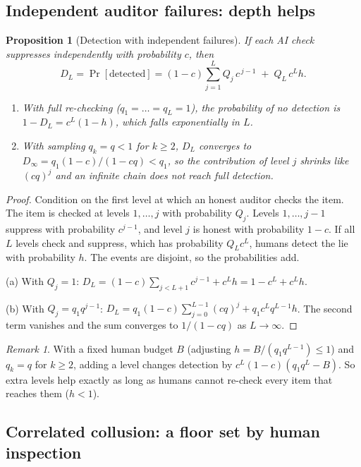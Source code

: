 \documentclass[11pt]{article}
\newtheorem{proposition}[theorem]{Proposition}
\theoremstyle{definition}
\theoremstyle{remark}
\newtheorem{remark}[theorem]{Remark}
\newcommand{\1}{\mathbf{1}}
\begin{document}
\subsection{Independent auditor failures: depth helps}

\begin{proposition}[Detection with independent failures]\label{prop:hier-indep}
If each AI check suppresses independently with probability $c$, then
\[
D_L=\Pr[\text{detected}]=(1-c)\sum_{j=1}^{L}Q_j\,c^{\,j-1} \;+\; Q_L\,c^{L}h .
\]
\begin{enumerate}[label=(\alph*)]
    \item With full re-checking ($q_1=\dots=q_L=1$), the probability of no detection is
    $1-D_L=c^L(1-h)$, which falls exponentially in $L$.
    \item With sampling $q_k=q<1$ for $k\ge2$, $D_L$ converges to
    $D_\infty=q_1(1-c)/(1-cq)<q_1$, so the contribution of level $j$ shrinks like
    $(cq)^{j}$ and an infinite chain does not reach full detection.
\end{enumerate}
\end{proposition}

\begin{proof}
Condition on the first level at which an honest auditor checks the item. The item is
checked at levels $1,\dots,j$ with probability $Q_j$. Levels $1,\dots,j-1$ suppress with
probability $c^{j-1}$, and level $j$ is honest with probability $1-c$. If all $L$ levels
check and suppress, which has probability $Q_Lc^L$, humans detect the lie with
probability $h$. The events are disjoint, so the probabilities add.

(a) With $Q_j=1$: $D_L=(1-c)\sum_{j<L+1}c^{j-1}+c^Lh=1-c^L+c^Lh$.

(b) With $Q_j=q_1q^{j-1}$: $D_L=q_1(1-c)\sum_{j=0}^{L-1}(cq)^j+q_1c^Lq^{L-1}h$. The
second term vanishes and the sum converges to $1/(1-cq)$ as $L\to\infty$.
\end{proof}

\begin{remark}
With a fixed human budget $B$ (adjusting $h=B/(q_1q^{L-1})\le1$) and $q_k=q$ for
$k\ge2$, adding a level changes detection by
$c^L(1-c)(q_1q^L-B)$. So extra levels help exactly as long as humans cannot re-check
every item that reaches them ($h<1$).
\end{remark}

\subsection{Correlated collusion: a floor set by human inspection}
\end{document}
